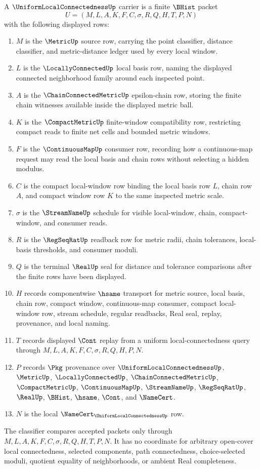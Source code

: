\begin{definition}
\label{def:uniform-local-connectedness-carrier}
A $\UniformLocalConnectednessUp$ carrier is a finite $\BHist$ packet
$$
U=(M,L,A,K,F,C,\sigma,R,Q,H,T,P,N)
$$
with the following displayed rows:
\begin{enumerate}
\item $M$ is the $\MetricUp$ source row, carrying the point classifier, distance classifier, and metric-distance ledger used by every local window.
\item $L$ is the $\LocallyConnectedUp$ local basis row, naming the displayed connected neighborhood family around each inspected point.
\item $A$ is the $\ChainConnectedMetricUp$ epsilon-chain row, storing the finite chain witnesses available inside the displayed metric ball.
\item $K$ is the $\CompactMetricUp$ finite-window compatibility row, restricting compact reads to finite net cells and bounded metric windows.
\item $F$ is the $\ContinuousMapUp$ consumer row, recording how a continuous-map request may read the local basis and chain rows without selecting a hidden modulus.
\item $C$ is the compact local-window row binding the local basis row $L$, chain row $A$, and compact window row $K$ to the same inspected metric scale.
\item $\sigma$ is the $\StreamNameUp$ schedule for visible local-window, chain, compact-window, and consumer reads.
\item $R$ is the $\RegSeqRatUp$ readback row for metric radii, chain tolerances, local-basis thresholds, and consumer moduli.
\item $Q$ is the terminal $\RealUp$ seal for distance and tolerance comparisons after the finite rows have been displayed.
\item $H$ records componentwise $\hsame$ transport for metric source, local basis, chain row, compact window, continuous-map consumer, compact local-window row, stream schedule, regular readbacks, Real seal, replay, provenance, and local naming.
\item $T$ records displayed $\Cont$ replay from a uniform local-connectedness query through $M,L,A,K,F,C,\sigma,R,Q,H,P,N$.
\item $P$ records $\Pkg$ provenance over $\UniformLocalConnectednessUp$, $\MetricUp$, $\LocallyConnectedUp$, $\ChainConnectedMetricUp$, $\CompactMetricUp$, $\ContinuousMapUp$, $\StreamNameUp$, $\RegSeqRatUp$, $\RealUp$, $\BHist$, $\hsame$, $\Cont$, and $\NameCert$.
\item $N$ is the local $\NameCert_{\UniformLocalConnectednessUp}$ row.
\end{enumerate}
The classifier compares accepted packets only through $M,L,A,K,F,C,\sigma,R,Q,H,T,P,N$. It has no coordinate for arbitrary open-cover local connectedness, selected components, path connectedness, choice-selected moduli, quotient equality of neighborhoods, or ambient Real completeness.
\end{definition}


